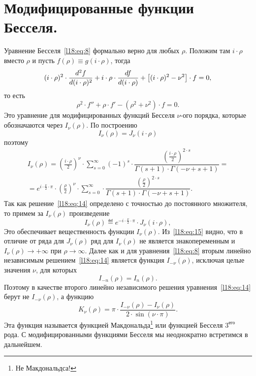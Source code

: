 \section{Модифицированные функции Бесселя.}
\label{lecture18section2}
Уравнение Бесселя~\eqref{l18:eq:8} формально верно для любых $\rho$. Положим там $i\cdot\rho$ вместо $\rho$ и пусть $f(\rho)\equiv g(i\cdot\rho)$, тогда
\begin{equation*}
	 (i\cdot\rho)^2\cdot\frac{d^2f}{d(i\cdot\rho)^2}+i\cdot\rho\cdot\frac{df}{d(i\cdot\rho)}+\big[(i\cdot\rho)^2-\nu^2\big]\cdot f=0,
\end{equation*}
то есть
\begin{equation}\label{l18:eq:14}
	 \rho^2\cdot f''+\rho\cdot f'-(\rho^2+\nu^2)\cdot f=0.
\end{equation}
Это уравнение для модифицированных функций Бесселя $\nu$-ого порядка, которые обозначаются через $I_{\nu}(\rho)$. По построению 
\begin{equation*}
	 I_{\nu}(\rho)=J_{\nu}(i\cdot\rho)
\end{equation*}
поэтому 
\begin{multline}\label{l18:eq:15}
	I_{\nu}(\rho)=\left(\frac{i\cdot \rho}{2}\right)^{\nu}\cdot\sum\limits_{s=0}^{\infty}(-1)^s\cdot\dfrac{\left(\frac{i\cdot\rho}{2}\right)^{2\cdot s}}{\Gamma(s+1)\cdot\Gamma(-\nu+s+1)}=\\=e^{\textstyle i\cdot\frac{\nu}{2}\cdot\pi}\cdot\left(\frac{ \rho}{2}\right)^{\nu}\cdot\sum\limits_{s=0}^{\infty}\cdot\dfrac{\left(\frac{\rho}{2}\right)^{2\cdot s}}{\Gamma(s+1)\cdot\Gamma(-\nu+s+1)}. 
\end{multline}
Так как решение~\eqref{l18:eq:14} определено с точностью до постоянного множителя, то примем за $I_{\nu}(\rho)$ произведение 
\begin{equation*}
	 I_{\nu}(\rho)\eqdef e^{\textstyle- i\cdot\frac{\nu}{2}\cdot\pi}\cdot J_{\nu}(i\cdot\rho),
\end{equation*}
Это обеспечивает вещественность функции $I_{\nu}(\rho)$. Из~\eqref{l18:eq:15} видно, что в отличие от ряда для $J_{\nu}(\rho)$ ряд для $I_{\nu}(\rho)$ не является знакопеременным и $I_{\nu}(\rho)\to+\infty$ при $\rho\to\infty$. Далее как и для уравнения~\eqref{l18:eq:8} вторым линейно независимым решением~\eqref{l18:eq:14} является функция $I_{-\nu}(\rho)$, исключая целые значения $\nu$, для которых 
\begin{equation*}
	 I_{-n}(\rho)=I_{n}(\rho).
\end{equation*}
Поэтому в качестве второго линейно независимого решения уравнения~\eqref{l18:eq:14} берут не $I_{-\nu}(\rho)$, а функцию 
\begin{equation*}
	 K_{\nu}(\rho)=\pi\cdot\dfrac{I_{-\nu}(\rho)-I_{\nu}(\rho)}{2\cdot\sin(\nu\cdot\pi)}.
\end{equation*}
Эта функция называется функцией Макдональда\footnote{Не Макдональдса!} или функцией Бесселя $3^{\text{его}}$ рода. С модифицированными функциями Бесселя мы неоднократно встретимся в дальнейшем.
